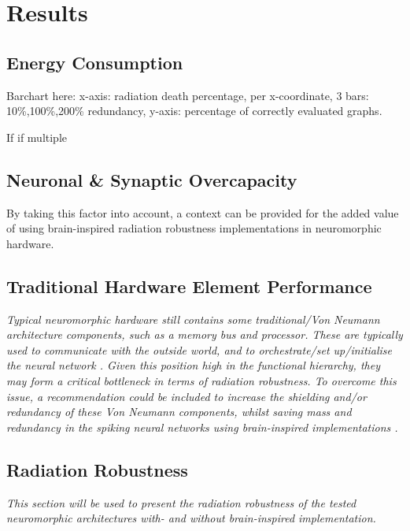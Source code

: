 \section{Results}\label{sec:results}

\subsection{Energy Consumption}\label{subsec:results_energy_consumption}
Barchart here: x-axis: radiation death percentage, per x-coordinate, 3 bars: 10\%,100\%,200\% redundancy, y-axis: percentage of correctly evaluated graphs.

If if multiple 

\subsection{Neuronal \& Synaptic Overcapacity}\label{subsec:results_neuronal_synaptic_overcapacity}
By taking this factor into account, a context can be provided for the added value of using brain-inspired radiation robustness implementations in neuromorphic hardware.

\subsection{Traditional Hardware Element Performance}\label{subsec:results_traditional_hardware_element_performance}
\textit{Typical neuromorphic hardware still contains some traditional/Von Neumann architecture components, such as a memory bus and processor. These are typically used to communicate with the outside world, and to orchestrate/set up/initialise the neural network \cite{todo}. Given this position high in the functional hierarchy, they may form a critical bottleneck in terms of radiation robustness. To overcome this issue, a recommendation could be included to increase the shielding and/or redundancy of these Von Neumann components, whilst saving mass and redundancy in the spiking neural networks using brain-inspired implementations \cite{johan_kwisthout_personal_corrospondence_feb_15}.}

\subsection{Radiation Robustness}\label{subsec:results_radiation_robustness}
\textit{This section will be used to present the radiation robustness of the tested neuromorphic architectures with- and without brain-inspired implementation.}